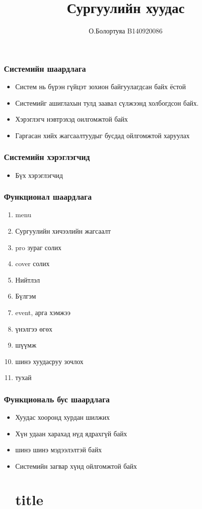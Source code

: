 \documentclass[12pt]{article}
\title{Сургуулийн хуудас}
\author{О.Болортуяа B140920086}
\begin{document}
	\maketitle
		\section{Системийн шаардлага}
		\begin{itemize}
			\item Систем нь бүрэн гүйцэт зохион байгуулагдсан байх ёстой
			\item Системийг ашиглахын тулд заавал сүлжээнд холбогдсон байх.
			\item Хэрэглэгч нэвтрэхэд оилгомжтой байх
			\item Гаргасан хийх  жагсаалтуудыг бусдад ойлгомжтой харуулах
		 	
		\end{itemize}
	\section{Системийн хэрэглэгчид}
	\begin{itemize}
		\item Бүх хэрэглэгчид
	\end{itemize}
\section{Функционал шаардлага}
\begin{enumerate}
	\item menu
		\item Сургуулийн хичээлийн жагсаалт
	\item  pro зураг солих
		\item cover солих
		\item Нийтлэл
		\item Бүлгэм
	\item event, арга хэмжээ
		\item үнэлгээ өгөх
		\item шүүмж
		\item шинэ хуудасруу зочлох
		\item тухай
	\end{enumerate}
\section{Функциональ бус шаардлага}	
\begin{itemize}
	\item Хуудас хооронд хурдан шилжих
	\item Хүн удаан харахад нүд ядрахгүй байх
	\item шинэ шинэ мэдээлэлтэй байх 
	\item Системийн загвар хүнд ойлгомжтой байх\part{title}
\end{itemize}
\end{document}
